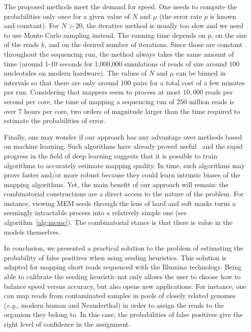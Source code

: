 \documentclass{article}
\begin{document}
The proposed methods meet the demand for speed. One needs to compute the
probabilities only once for a given value of $N$ and $\mu$ (the error rate
$p$ is known and constant). For $N > 20$, the iterative method is usually
too slow and we need to use Monte Carlo sampling instead. The running time
depends on $p$, on the size of the reads $k$, and on the desired number of
iterations. Since those are constant throughout the sequencing run, the
method always takes the same amount of time (around 1-10 seconds for
1,000,000 simulations of reads of size around $100$ nucleotides on modern
hardware). The values of $N$ and $\mu$ can be binned in intervals so that
there are only around $100$ pairs for a total cost of a few minutes per
run. Considering that mappers seem to process at most $10,000$ reads per
second per core, the time of mapping a sequencing run of 250 million reads
is over 7 hours per core, two orders of magnitude larger than the time
required to estimate the probabilities of error.

Finally, one may wonder if our approach has any advantage over methods
based on machine learning. Such algorithms have already proved
useful~\cite{lee2014mosaik} and the rapid progress in the field of deep
learning suggests that it is possible to train algorithms to accurately
estimate mapping quality. In time, such algorithms may prove faster and/or
more robust because they could learn intrinsic biases of the mapping
algorithms. Yet, the main benefit of our approach will remain: the
combinatorial constructions are a direct access to the nature of the
problem. For instance, viewing MEM seeds through the lens of hard and soft
masks turns a seemingly intractable process into a relatively simple one
(see algorithm~\ref{alg:mcmc}). The combinatorial stance is that there is
value in the models themselves.

In conclusion, we presented a practical solution to the problem of
estimating the probability of false positives when using seeding
heuristics. This solution is adapted for mapping short reads sequenced
with the Illumina technology. Being able to calibrate the seeding
heuristic not only allows the user to choose how to balance speed versus
accuracy, but also opens new applications. For instance, one can map reads
from contaminated samples in pools of closely related genomes
(\textit{e.g.}, modern human and Neanderthal) in order to assign the reads
to the organism they belong to. In this case, the probabilities of false
positives give the right level of confidence in the assignment.
\end{document}
